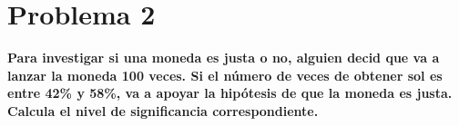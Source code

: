 \section*{Problema 2}

\textbf{Para investigar si una moneda es justa o no, alguien decid que va a lanzar la moneda 100 veces. Si el número de veces de obtener sol es entre 42\% y 58\%, va a apoyar la hipótesis de que la moneda es justa. Calcula el nivel de significancia correspondiente.}
